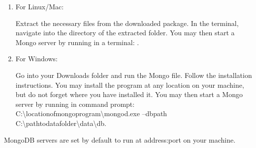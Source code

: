 \begin{enumerate}
\item For Linux/Mac:

Extract the necessary files from the downloaded package.
In the terminal, navigate into the  directory of the extracted folder.
You may then start a Mongo server by running in a terminal: .

\item For Windows:

Go into your Downloads folder and run the Mongo  file.
Follow the installation instructions.
You may install the program at any location on your machine, but do not forget where you have installed it.
You may then start a Mongo server by running in command prompt: C:\textbackslash locationofmongoprogram\textbackslash mongod.exe --dbpath C:\textbackslash pathtodatafolder\textbackslash data\textbackslash db.
\end{enumerate}

MongoDB servers are set by default to run at address:port  on your machine.
